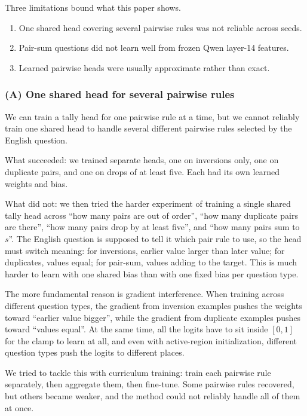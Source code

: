 \documentclass[10pt]{article}
\theoremstyle{definition}
\begin{document}
Three limitations bound what this paper shows.

\begin{enumerate}
\item One shared head covering several pairwise rules was not reliable
  across seeds.
\item Pair-sum questions did not learn well from frozen Qwen layer-14
  features.
\item Learned pairwise heads were usually approximate rather than exact.
\end{enumerate}

\subsubsection*{(A) One shared head for several pairwise rules}

We can train a tally head for one pairwise rule at a time, but we cannot
reliably train one shared head to handle several different pairwise rules
selected by the English question.

What succeeded: we trained separate heads, one on inversions only, one on
duplicate pairs, and one on drops of at least five. Each had its own
learned weights and bias.

What did not: we then tried the harder experiment of training a single
shared tally head across ``how many pairs are out of order'', ``how many
duplicate pairs are there'', ``how many pairs drop by at least five'', and
``how many pairs sum to $s$''. The English question is supposed to tell it
which pair rule to use, so the head must switch meaning: for inversions,
earlier value larger than later value; for duplicates, values equal; for
pair-sum, values adding to the target. This is much harder to learn with
one shared bias than with one fixed bias per question type.

The more fundamental reason is gradient interference. When training across
different question types, the gradient from inversion examples pushes the
weights toward ``earlier value bigger'', while the gradient from duplicate
examples pushes toward ``values equal''. At the same time, all the logits
have to sit inside $[0,1]$ for the clamp to learn at all, and even with
active-region initialization, different question types push the logits to
different places.

We tried to tackle this with curriculum training: train each pairwise rule
separately, then aggregate them, then fine-tune. Some pairwise rules
recovered, but others became weaker, and the method could not reliably
handle all of them at once.
\end{document}
